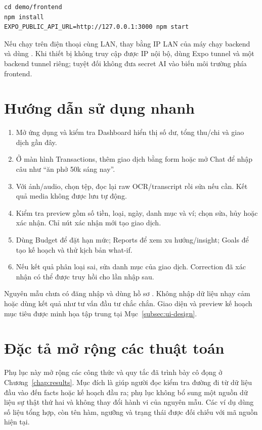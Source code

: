 \begin{verbatim}
cd demo/frontend
npm install
EXPO_PUBLIC_API_URL=http://127.0.0.1:3000 npm start
\end{verbatim}

Nếu chạy trên điện thoại cùng LAN, thay  bằng IP LAN của máy chạy backend và dùng . Khi thiết bị không truy cập được IP nội bộ, dùng Expo tunnel và một backend tunnel riêng; tuyệt đối không đưa secret AI vào biến môi trường phía frontend.

\chapter{Hướng dẫn sử dụng nhanh}

\begin{enumerate}
  \item Mở ứng dụng và kiểm tra Dashboard hiển thị số dư, tổng thu/chi và giao dịch gần đây.
  \item Ở màn hình Transactions, thêm giao dịch bằng form hoặc mở Chat để nhập câu như ``ăn phở 50k sáng nay''.
  \item Với ảnh/audio, chọn tệp, đọc lại raw OCR/transcript rồi sửa nếu cần. Kết quả media không được lưu tự động.
  \item Kiểm tra preview gồm số tiền, loại, ngày, danh mục và ví; chọn sửa, hủy hoặc xác nhận. Chỉ nút xác nhận mới tạo giao dịch.
  \item Dùng Budget để đặt hạn mức; Reports để xem xu hướng/insight; Goals để tạo kế hoạch và thử kịch bản what-if.
  \item Nếu kết quả phân loại sai, sửa danh mục của giao dịch. Correction đã xác nhận có thể được truy hồi cho lần nhập sau.
\end{enumerate}

Nguyên mẫu chưa có đăng nhập và dùng hồ sơ . Không nhập dữ liệu nhạy cảm hoặc dùng kết quả như tư vấn đầu tư chắc chắn. Giao diện và preview kế hoạch mục tiêu được minh họa tập trung tại Mục~\ref{subsec:ui-design}.



\chapter{Đặc tả mở rộng các thuật toán}
\label{app:algorithms}

Phụ lục này mở rộng các công thức và quy tắc đã trình bày cô đọng ở Chương~\ref{chap:results}. Mục đích là giúp người đọc kiểm tra đường đi từ dữ liệu đầu vào đến facts hoặc kế hoạch đầu ra; phụ lục không bổ sung một nguồn dữ liệu sự thật thứ hai và không thay đổi hành vi của nguyên mẫu. Các ví dụ dùng số liệu tổng hợp, còn tên hàm, ngưỡng và trạng thái được đối chiếu với mã nguồn hiện tại.

